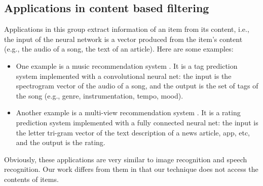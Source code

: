 \documentclass[letterpaper]{article}
\begin{document}
\subsection{Applications in content based filtering}
Applications in this group extract information of an item from its content, 
i.e., the input of the neural network is a vector produced from the item's 
content (e.g., the audio of a song, the text of an article). Here are some 
examples:
\begin{itemize}
	\item One example is a music recommendation system 
	\citeauthor{van2013deep}. 
	It is a tag prediction system implemented with a convolutional neural net: 
	the input is the spectrogram vector of the audio of a song, and the output 
	is the set of tags of the song (e.g., genre, instrumentation, tempo, mood).
	\item Another example is a multi-view recommendation system 
	\citeauthor{elkahky2015multi}. 
	It is a rating prediction system implemented with a fully connected neural 
	net: the input is the letter tri-gram vector of the text description of a 
	news article, app, etc, and the output is the rating.
\end{itemize}
Obviously, these applications are very similar to image recognition and speech 
recognition.
Our work differs from them in that our technique does not access the contents 
of items.
\end{document}
